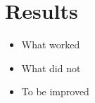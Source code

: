\section{Results}\label{sec:results}
\begin{itemize}
\item What worked
\item What did not
\item To be improved
\end{itemize}
